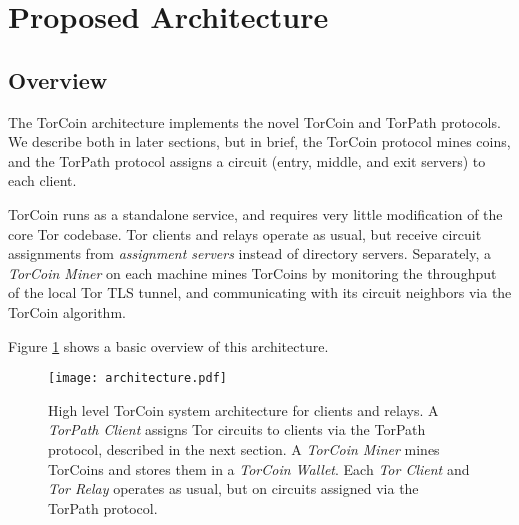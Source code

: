 \section{Proposed Architecture} \label{arch}

\subsection{Overview}

The TorCoin architecture implements the novel TorCoin and TorPath protocols. We
describe both in later sections, but in brief, the TorCoin protocol mines
coins, and the TorPath protocol assigns a circuit (entry, middle, and exit
servers) to each client.

TorCoin runs as a standalone service, and requires very little modification of
the core Tor codebase. Tor clients and relays operate as usual, but receive
circuit assignments from \textit{assignment servers} instead of directory 
servers. Separately, a \textit{TorCoin Miner} on each machine mines TorCoins
by monitoring the throughput of the local Tor TLS tunnel, and communicating with its circuit neighbors via the TorCoin algorithm.

Figure \ref{figure:archi} shows a basic overview of this architecture.

\begin{figure}
  \centering
    \texttt{[image: architecture.pdf]}
  \caption{High level TorCoin system architecture for clients and relays. A \textit{TorPath Client} assigns Tor circuits to clients via the TorPath protocol, described in the next section. A \textit{TorCoin Miner} mines TorCoins and stores them in a \textit{TorCoin Wallet}. Each \textit{Tor Client} and \textit{Tor Relay} operates as usual, but on circuits assigned via the TorPath protocol.}
  \label{figure:archi}
\end{figure}





